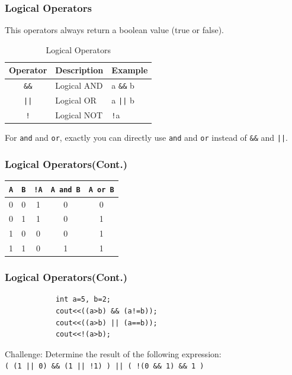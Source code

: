 \documentclass[xcolor=dvipsnames]{beamer}
\begin{document}
    \begin{frame}
        \frametitle{Logical Operators}
        \begin{table}[h]
        \centering
        \caption{Logical Operators}
        This operators always return a boolean value (true or false).
        \begin{tabular}{cll}
        \toprule
        \textbf{Operator} & \textbf{Description} & \textbf{Example} \\
         \midrule
            \texttt{\&\&} & Logical AND & a \texttt{\&\&} b \\
            \texttt{||}  & Logical OR & a \texttt{||} b \\
            \texttt{!}   & Logical NOT & \texttt{!}a \\
        \bottomrule
        \end{tabular}
        \end{table}
        For \texttt{and} and \texttt{or}, exactly you can directly use \texttt{and} and \texttt{or} instead of \texttt{\&\&} and \texttt{||}.
    \end{frame}

    \begin{frame}
        \frametitle{Logical Operators(Cont.)}
        \begin{table}[h]
            \centering
            \begin{tabular}{|c|c||c|c|c|}
                \hline
                \texttt{A} & \texttt{B} & \texttt{!A} & \texttt{A and B} & \texttt{A or B} \\
                \hline
                0 & 0 & 1 & 0 & 0 \\
                0 & 1 & 1 & 0 & 1 \\
                1 & 0 & 0 & 0 & 1 \\
                1 & 1 & 0 & 1 & 1 \\
                \hline
            \end{tabular}
        \end{table}
    \end{frame}

    \begin{frame}[fragile]
        \frametitle{Logical Operators(Cont.)}
        \begin{verbatim}
            int a=5, b=2;
            cout<<((a>b) && (a!=b));
            cout<<((a>b) || (a==b));
            cout<<!(a>b);
        \end{verbatim}
        Challenge: Determine the result of the following expression:\\
        \texttt{( (1 || 0) \&\& (1 || !1) ) || ( !(0 \&\& 1) \&\& 1 )}
    \end{frame}
\end{document}
